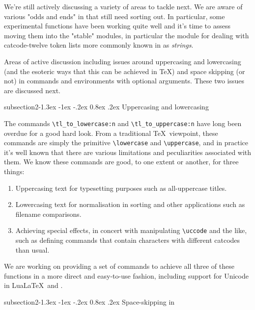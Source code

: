 \documentclass{ltnews}
\makeatletter
\providecommand\LuaLaTeX{Lua\LaTeX}
\renewcommand{\@subheadingfont}{%
   \sffamily\slshape
   \let\LaTeX\cmssLaTeX\let\TeX\cmssTeX
}
\renewcommand{\subsection}{%
   \@startsection
      {subsection}{2}{\z@}{-1.3ex \@plus -1ex \@minus -.2ex}%
      {0.8ex \@plus.2ex}{\@subheadingfont}%
}
\makeatother
\begin{document}
We're still actively discussing a variety of areas to tackle next.
We are aware of various "odds and ends" in  that still need sorting out.
In particular, some experimental functions have been working quite well and it's time to assess moving them into the "stable" modules, in particular the  module for dealing with catcode-twelve token lists more commonly known in  as \emph{strings}.

Areas of active discussion including issues around uppercasing and lowercasing (and the esoteric ways that this can be achieved in \TeX) and space skipping (or not) in commands and environments with optional arguments.
These two issues are discussed next.

\subsection{Uppercasing and lowercasing}

The commands \verb"\tl_to_lowercase:n" and \verb"\tl_to_uppercase:n" have long been overdue for a good hard look.
From a traditional \TeX\ viewpoint, these commands are simply the primitive \verb"\lowercase" and \verb"\uppercase", and in practice it's well known that there are various limitations and peculiarities associated with them.
We know these commands are good, to one extent or another, for three things:
\begin{enumerate}
\item
Uppercasing text for typesetting purposes such as all-uppercase titles.
\item
Lowercasing text for normalisation in sorting and other applications such as filename comparisons.
\item
Achieving special effects, in concert with manipulating \verb"\uccode" and the like, such as defining commands that contain characters with different catcodes than usual.
\end{enumerate}
We are working on providing a set of commands to achieve all three of these functions in a more direct and easy-to-use fashion, including support for Unicode in \LuaLaTeX\ and \XeLaTeX.

\pagebreak

\subsection{Space-skipping in }
\end{document}
